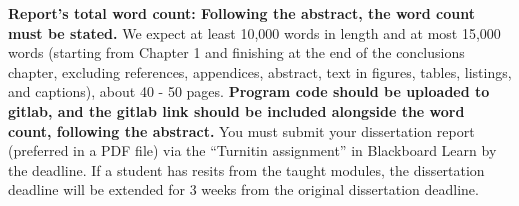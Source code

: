 \vfill
\noindent
\textbf{Report's total word count: Following the abstract, the word count must be stated.} We expect at least 10,000 words in length and at most 15,000 words (starting from Chapter 1 and finishing at the end of the conclusions chapter, excluding references, appendices, abstract, text in figures, tables, listings, and captions), about 40 - 50 pages. \newline
\newline
\noindent
\textbf{Program code should be uploaded to gitlab, and the gitlab link should be included alongside the word count, following the abstract.} \newline
\newline
You must submit your dissertation report (preferred in a PDF file) via the “Turnitin assignment” in Blackboard Learn by the deadline. If a student has resits from the taught modules, the dissertation deadline will be extended for 3 weeks from the original dissertation deadline.

